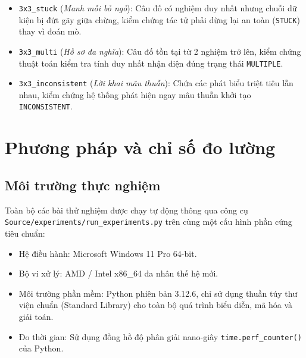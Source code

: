 \begin{enumerate}
    \begin{itemize}
        \item \texttt{3x3\_stuck} (\textit{Manh mối bỏ ngỏ}): Câu đố có nghiệm duy nhất nhưng chuỗi dữ kiện bị đứt gãy giữa chừng, kiểm chứng tác tử phải dừng lại an toàn (\texttt{STUCK}) thay vì đoán mò.
        \item \texttt{3x3\_multi} (\textit{Hồ sơ đa nghĩa}): Câu đố tồn tại từ 2 nghiệm trở lên, kiểm chứng thuật toán kiểm tra tính duy nhất nhận diện đúng trạng thái \texttt{MULTIPLE}.
        \item \texttt{3x3\_inconsistent} (\textit{Lời khai mâu thuẫn}): Chứa các phát biểu triệt tiêu lẫn nhau, kiểm chứng hệ thống phát hiện ngay mâu thuẫn khởi tạo \texttt{INCONSISTENT}.
    \end{itemize}
\end{enumerate}

\section{Phương pháp và chỉ số đo lường}
\label{sec:phuong-phap-do-luong}

\subsection{Môi trường thực nghiệm}
Toàn bộ các bài thử nghiệm được chạy tự động thông qua công cụ \texttt{Source/experiments/run\_experiments.py} trên cùng một cấu hình phần cứng tiêu chuẩn:
\begin{itemize}
    \item Hệ điều hành: Microsoft Windows 11 Pro 64-bit.
    \item Bộ vi xử lý: AMD / Intel x86\_64 đa nhân thế hệ mới.
    \item Môi trường phần mềm: Python phiên bản 3.12.6, chỉ sử dụng thuần túy thư viện chuẩn (Standard Library) cho toàn bộ quá trình biểu diễn, mã hóa và giải toán.
    \item Đo thời gian: Sử dụng đồng hồ độ phân giải nano-giây \texttt{time.perf\_counter()} của Python.
\end{itemize}

